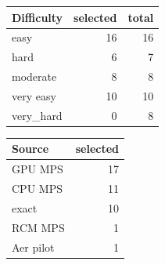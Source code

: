 \newcommand{\ReportGenerated}{2026-06-06 06:31:01 BST}
\newcommand{\SelectedCount}{40}
\newcommand{\TotalCount}{49}
\newcommand{\UnresolvedList}{64\_40, 104\_49, 48\_42, 56\_43, 64\_44, 72\_45, 80\_46, 88\_47, 96\_48}

\begin{tabular}{lrr}
\toprule
Difficulty & selected & total \\
\midrule
easy & 16 & 16 \\
hard & 6 & 7 \\
moderate & 8 & 8 \\
very easy & 10 & 10 \\
very\_hard & 0 & 8 \\
\bottomrule
\end{tabular}

\bigskip

\begin{tabular}{lr}
\toprule
Source & selected \\ 
\midrule
GPU MPS & 17 \\
CPU MPS & 11 \\
exact & 10 \\
RCM MPS & 1 \\
Aer pilot & 1 \\
\bottomrule
\end{tabular}

\bigskip

